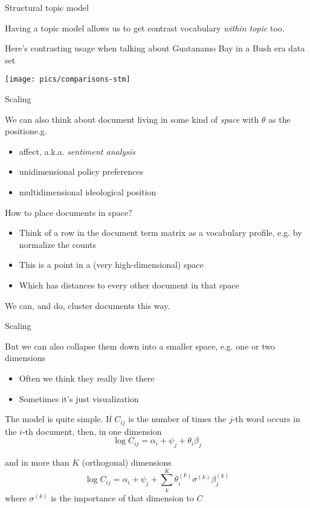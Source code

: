 \documentclass{hertieteaching}
\begin{document}
\begin{frame}{Structural topic model}

Having a topic model allows us to get contrast vocabulary \textit{within topic} too. 

Here's contrasting usage when talking about Guatanamo Bay in a Bush era data set

\centerline{\texttt{[image: pics/comparisons-stm]}}
	
\end{frame}
\begin{frame}{Scaling}

We can also think about document living in some kind of \textit{space} with $\theta$ as the positione.g.
\begin{itemize}
  \item affect, a.k.a. \textit{sentiment analysis}
  \item unidimensional policy preferences
  \item multidimensional ideological position
\end{itemize}

How to place documents in space?
\begin{itemize}
  \item Think of a row in the document term matrix as a vocabulary profile, e.g. by normalize the counts
  \item This is a point in a (very high-dimensional) space
  \item Which has distances to every other document in that space
\end{itemize}
We can, and do, cluster documents this way.

\end{frame}

\begin{frame}{Scaling}

But we can also collapse them down into a smaller space, e.g. one or two dimensions
\begin{itemize}
  \item Often we think they really live there
  \item Sometimes it's just visualization
\end{itemize}

The model is quite simple. If $C_{ij}$ is the number of times the $j$-th word occurs in the $i$-th document, then, in one dimension
$$
\log C_{ij} = \alpha_i + \psi_j + \theta_i\beta_j
$$

\pause

and in more than $K$ (orthogonal) dimensions
$$
\log C_{ij} = \alpha_i + \psi_j + \sum^K_k \theta^{(k)}_i\sigma^{(k)}\beta^{(k)}_j
$$
where $\sigma^{(k)}$ is the importance of that dimension to $C$


\end{frame}
\end{document}
